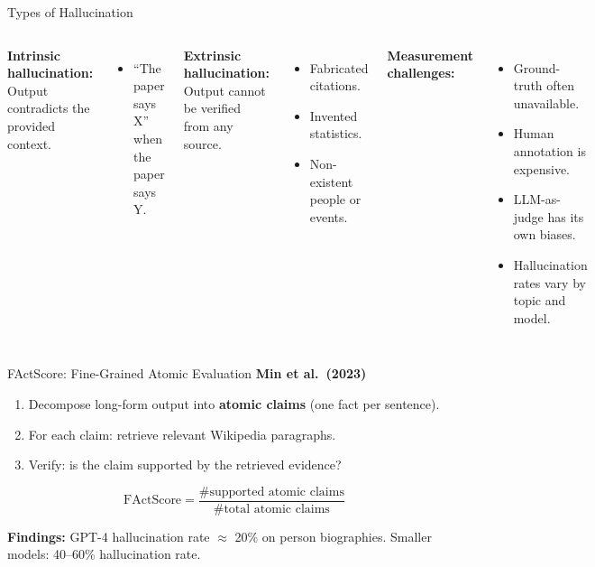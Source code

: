 \documentclass[aspectratio=169,10pt]{beamer}
\begin{document}
\begin{frame}{Types of Hallucination}
  \begin{columns}[T]
      \textbf{Intrinsic hallucination:}\\
      Output contradicts the provided context.
      \begin{itemize}
        \item ``The paper says X'' when the paper says Y.
      \end{itemize}
      \vspace{0.5em}
      \textbf{Extrinsic hallucination:}\\
      Output cannot be verified from any source.
      \begin{itemize}
        \item Fabricated citations.
        \item Invented statistics.
        \item Non-existent people or events.
      \end{itemize}
      \textbf{Measurement challenges:}
      \begin{itemize}
        \item Ground-truth often unavailable.
        \item Human annotation is expensive.
        \item LLM-as-judge has its own biases.
        \item Hallucination rates vary by topic and model.
      \end{itemize}
  \end{columns}
\end{frame}

\begin{frame}{FActScore: Fine-Grained Atomic Evaluation}
  \textbf{Min et al.\ (2023)}~\cite{min2023factscore}
  \vspace{0.4em}
  \begin{tcolorbox}[hitbox, title=FActScore]
    \begin{enumerate}
      \item Decompose long-form output into \textbf{atomic claims} (one fact per sentence).
      \item For each claim: retrieve relevant Wikipedia paragraphs.
      \item Verify: is the claim supported by the retrieved evidence?
    \end{enumerate}
    \[
      \text{FActScore} = \frac{\text{\# supported atomic claims}}{\text{\# total atomic claims}}
    \]
  \end{tcolorbox}
  \vspace{0.3em}
  \textbf{Findings:} GPT-4 hallucination rate $\approx$ 20\% on person biographies.
  Smaller models: 40–60\% hallucination rate.
\end{frame}
\end{document}
